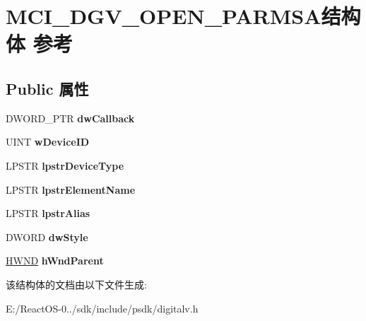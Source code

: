 \hypertarget{struct_m_c_i___d_g_v___o_p_e_n___p_a_r_m_s_a}{}\section{M\+C\+I\+\_\+\+D\+G\+V\+\_\+\+O\+P\+E\+N\+\_\+\+P\+A\+R\+M\+S\+A结构体 参考}
\label{struct_m_c_i___d_g_v___o_p_e_n___p_a_r_m_s_a}
\subsection*{Public 属性}
\begin{DoxyCompactItemize}
\item 
\mbox{\label{struct_m_c_i___d_g_v___o_p_e_n___p_a_r_m_s_a_a894bfda3b7813e0e4f1c95c7c7734668}} 
D\+W\+O\+R\+D\+\_\+\+P\+TR {\bfseries dw\+Callback}
\item 
\mbox{\label{struct_m_c_i___d_g_v___o_p_e_n___p_a_r_m_s_a_a009d62a8423347a59ff397fb48f9513e}} 
U\+I\+NT {\bfseries w\+Device\+ID}
\item 
\mbox{\label{struct_m_c_i___d_g_v___o_p_e_n___p_a_r_m_s_a_aecbf5c19a276355245fd140915bbfc1c}} 
L\+P\+S\+TR {\bfseries lpstr\+Device\+Type}
\item 
\mbox{\label{struct_m_c_i___d_g_v___o_p_e_n___p_a_r_m_s_a_a10a874ea81f2117fcf598ff6773d2c7b}} 
L\+P\+S\+TR {\bfseries lpstr\+Element\+Name}
\item 
\mbox{\label{struct_m_c_i___d_g_v___o_p_e_n___p_a_r_m_s_a_aaad9b45f66e94c9be691fb6773b4265e}} 
L\+P\+S\+TR {\bfseries lpstr\+Alias}
\item 
\mbox{\label{struct_m_c_i___d_g_v___o_p_e_n___p_a_r_m_s_a_a1fca70b61ee23fc519ee78c0d2dc2564}} 
D\+W\+O\+RD {\bfseries dw\+Style}
\item 
\mbox{\label{struct_m_c_i___d_g_v___o_p_e_n___p_a_r_m_s_a_a54790b66623f33202841a1386196a25f}} 
\hyperlink{interfacevoid}{H\+W\+ND} {\bfseries h\+Wnd\+Parent}
\end{DoxyCompactItemize}


该结构体的文档由以下文件生成\+:\begin{DoxyCompactItemize}
\item 
E\+:/\+React\+O\+S-\/0../sdk/include/psdk/digitalv.\+h\end{DoxyCompactItemize}
